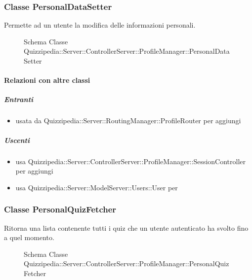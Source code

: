 \subsubsection{Classe PersonalDataSetter}
Permette ad un utente la modifica delle informazioni personali.
\begin{figure}[H]
\centering
\noindent{}
\caption[Schema Classe PersonalDataSetter]{Schema Classe Quizzipedia::Server::ControllerServer::ProfileManager::PersonalDataSetter}
\end{figure}
\paragraph{Relazioni con altre classi}
\subparagraph{Entranti}
\begin{itemize}
\item usata da Quizzipedia::Server::RoutingManager::ProfileRouter per aggiungi
\end{itemize}
\subparagraph{Uscenti}
\begin{itemize}
\item usa Quizzipedia::Server::ControllerServer::ProfileManager::SessionController per aggiungi
\item usa Quizzipedia::Server::ModelServer::Users::User per 
\end{itemize}
\subsubsection{Classe PersonalQuizFetcher}
Ritorna una lista contenente tutti i quiz che un utente autenticato ha svolto fino a quel momento.
\begin{figure}[H]
\centering
\noindent{}
\caption[Schema Classe PersonalQuizFetcher]{Schema Classe Quizzipedia::Server::ControllerServer::ProfileManager::PersonalQuizFetcher}
\end{figure}
